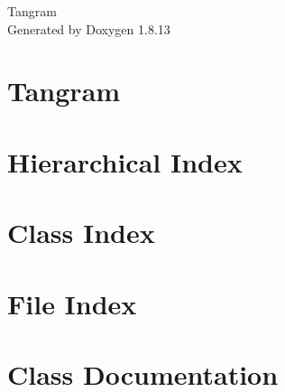 \documentclass[twoside]{book}
\newcommand{\+}{\discretionary{\mbox{\scriptsize$\hookleftarrow$}}{}{}}
\newcommand{\clearemptydoublepage}{%
  \newpage{\pagestyle{empty}\cleardoublepage}%
}
\begin{document}
\hypersetup{pageanchor=false,
             bookmarksnumbered=true,
             pdfencoding=unicode
            }
\begin{titlepage}
\vspace*{7cm}
\begin{center}%
{\Large Tangram }\\
\vspace*{1cm}
{\large Generated by Doxygen 1.8.13}\\
\end{center}
\end{titlepage}
\clearemptydoublepage
{}
\tableofcontents
\clearemptydoublepage
{}
\hypersetup{pageanchor=true}

\chapter{Tangram}
\label{md_README}

\chapter{Hierarchical Index}

\chapter{Class Index}

\chapter{File Index}

\chapter{Class Documentation}

















\end{document}
